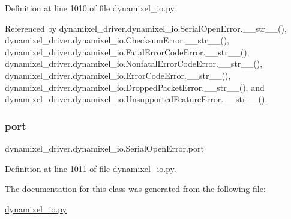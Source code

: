 Definition at line 1010 of file dynamixel\+\_\+io.\+py.



Referenced by dynamixel\+\_\+driver.\+dynamixel\+\_\+io.\+Serial\+Open\+Error.\+\_\+\+\_\+str\+\_\+\+\_\+(), dynamixel\+\_\+driver.\+dynamixel\+\_\+io.\+Checksum\+Error.\+\_\+\+\_\+str\+\_\+\+\_\+(), dynamixel\+\_\+driver.\+dynamixel\+\_\+io.\+Fatal\+Error\+Code\+Error.\+\_\+\+\_\+str\+\_\+\+\_\+(), dynamixel\+\_\+driver.\+dynamixel\+\_\+io.\+Nonfatal\+Error\+Code\+Error.\+\_\+\+\_\+str\+\_\+\+\_\+(), dynamixel\+\_\+driver.\+dynamixel\+\_\+io.\+Error\+Code\+Error.\+\_\+\+\_\+str\+\_\+\+\_\+(), dynamixel\+\_\+driver.\+dynamixel\+\_\+io.\+Dropped\+Packet\+Error.\+\_\+\+\_\+str\+\_\+\+\_\+(), and dynamixel\+\_\+driver.\+dynamixel\+\_\+io.\+Unsupported\+Feature\+Error.\+\_\+\+\_\+str\+\_\+\+\_\+().

\mbox{\label{classdynamixel__driver_1_1dynamixel__io_1_1_serial_open_error_aea5b64cc7e9d7aa4e02f2b249ab9e8ae}} 
\subsubsection{\texorpdfstring{port}{port}}
{\footnotesize\ttfamily dynamixel\+\_\+driver.\+dynamixel\+\_\+io.\+Serial\+Open\+Error.\+port}



Definition at line 1011 of file dynamixel\+\_\+io.\+py.



The documentation for this class was generated from the following file\+:\begin{DoxyCompactItemize}
\item 
\hyperlink{dynamixel__io_8py}{dynamixel\+\_\+io.\+py}\end{DoxyCompactItemize}
